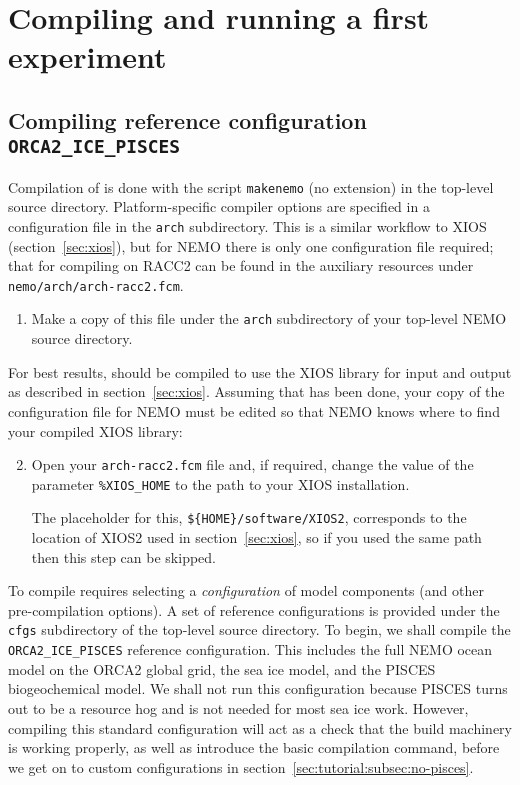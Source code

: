 \section{Compiling and running a first experiment}
\label{sec:tutorial}

\subsection{Compiling reference configuration \texorpdfstring{\texttt{ORCA2\_ICE\_PISCES}}{ORCA2 ICE PISCES}}
\label{sec:tutorial:subsec:compiling}

Compilation of \NEMOSIcu{} is done with the script \verb|makenemo| (no extension) in the top-level source directory.
Platform-specific compiler options are specified in a configuration file in the \verb|arch| subdirectory.
This is a similar workflow to XIOS (section~\ref{sec:xios}), but for NEMO there is only one configuration file required; that for compiling on RACC2 can be found in the auxiliary resources under \verb|nemo/arch/arch-racc2.fcm|.

\begin{enumerate}
    \item Make a copy of this file under the \verb|arch| subdirectory of your top-level NEMO source directory.
\end{enumerate}

For best results, \NEMOSIcu{} should be compiled to use the XIOS library for input and output as described in section~\ref{sec:xios}.
Assuming that has been done, your copy of the configuration file for NEMO must be edited so that NEMO knows where to find your compiled XIOS library:

\begin{enumerate}\setcounter{enumi}{1}
    \item Open your \verb|arch-racc2.fcm| file and, if required, change the value of the parameter \verb|%XIOS_HOME| to the path to your XIOS installation.
    
    The placeholder for this, \verb|${HOME}/software/XIOS2|, corresponds to the location of XIOS2 used in section~\ref{sec:xios}, so if you used the same path then this step can be skipped.
\end{enumerate}

To compile \NEMOSIcu{} requires selecting a \textit{configuration} of model components (and other pre-compilation options).
A set of reference configurations is provided under the \verb|cfgs| subdirectory of the top-level source directory.
To begin, we shall compile the \verb|ORCA2_ICE_PISCES| reference configuration.
This includes the full NEMO ocean model on the ORCA2 global grid, the \SIcu{} sea ice model, and the PISCES biogeochemical model.
We shall not run this configuration because PISCES turns out to be a resource hog and is not needed for most sea ice work.
However, compiling this standard configuration will act as a check that the build machinery is working properly, as well as introduce the basic compilation command, before we get on to custom configurations in section~\ref{sec:tutorial:subsec:no-pisces}.

